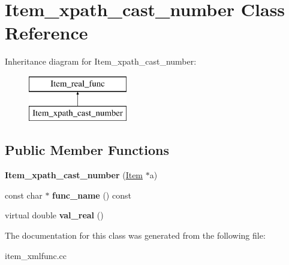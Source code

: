 \hypertarget{classItem__xpath__cast__number}{}\section{Item\+\_\+xpath\+\_\+cast\+\_\+number Class Reference}
\label{classItem__xpath__cast__number}
Inheritance diagram for Item\+\_\+xpath\+\_\+cast\+\_\+number\+:\begin{figure}[H]
\begin{center}
\leavevmode
\includegraphics[height=2.000000cm]{classItem__xpath__cast__number}
\end{center}
\end{figure}
\subsection*{Public Member Functions}
\begin{DoxyCompactItemize}
\item 
\mbox{\label{classItem__xpath__cast__number_a536ce5f17c6c6ff7e9a55ce0fa2bbe38}} 
{\bfseries Item\+\_\+xpath\+\_\+cast\+\_\+number} (\mbox{\hyperlink{classItem}{Item}} $\ast$a)
\item 
\mbox{\label{classItem__xpath__cast__number_a9f1014a0229a148e93742ea8e3674494}} 
const char $\ast$ {\bfseries func\+\_\+name} () const
\item 
\mbox{\label{classItem__xpath__cast__number_aa0ab18765ddd05d3dc5174666f5a3d96}} 
virtual double {\bfseries val\+\_\+real} ()
\end{DoxyCompactItemize}


The documentation for this class was generated from the following file\+:\begin{DoxyCompactItemize}
\item 
item\+\_\+xmlfunc.\+cc\end{DoxyCompactItemize}
